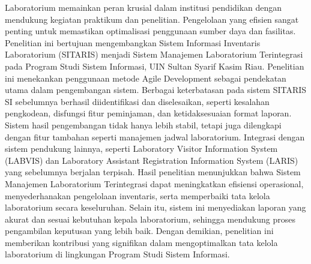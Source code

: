 \noindent
\fontsize{10pt}{12pt}\selectfont
Laboratorium memainkan peran krusial dalam institusi pendidikan dengan mendukung kegiatan praktikum dan penelitian. Pengelolaan yang efisien sangat penting untuk memastikan optimalisasi penggunaan sumber daya dan fasilitas. Penelitian ini bertujuan mengembangkan Sistem Informasi Inventaris Laboratorium (SITARIS) menjadi Sistem Manajemen Laboratorium Terintegrasi pada Program Studi Sistem Informasi, UIN Sultan Syarif Kasim Riau. Penelitian ini menekankan penggunaan metode Agile Development sebagai pendekatan utama dalam pengembangan sistem. Berbagai keterbatasan pada sistem SITARIS SI sebelumnya berhasil diidentifikasi dan diselesaikan, seperti kesalahan pengkodean, disfungsi fitur peminjaman, dan ketidaksesuaian format laporan. Sistem hasil pengembangan tidak hanya lebih stabil, tetapi juga dilengkapi dengan fitur tambahan seperti manajemen jadwal laboratorium. Integrasi dengan sistem pendukung lainnya, seperti Laboratory Visitor Information System (LABVIS) dan Laboratory Assistant Registration Information System (LARIS) yang sebelumnya berjalan terpisah. Hasil penelitian menunjukkan bahwa Sistem Manajemen Laboratorium Terintegrasi dapat meningkatkan efisiensi operasional, menyederhanakan pengelolaan inventaris, serta memperbaiki tata kelola laboratorium secara keseluruhan. Selain itu, sistem ini menyediakan laporan yang akurat dan sesuai kebutuhan kepala laboratorium, sehingga mendukung proses pengambilan keputusan yang lebih baik. Dengan demikian, penelitian ini memberikan kontribusi yang signifikan dalam mengoptimalkan tata kelola laboratorium di lingkungan Program Studi Sistem Informasi.\\
 \\